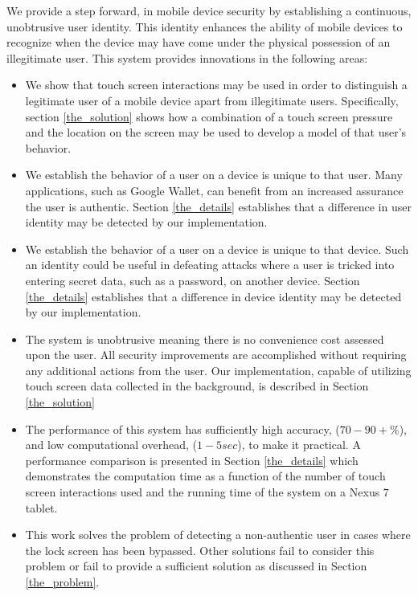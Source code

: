 We provide a step forward, 
%
in mobile device security by
establishing a continuous, unobtrusive user identity.
%
This identity
enhances the ability of mobile devices to
recognize when the 
device may have come under
the physical possession of an illegitimate user.
%
This system provides innovations in the following areas:
\begin{itemize}
\item We show that touch screen interactions may be used in order to
  distinguish a legitimate user of a mobile device apart from
  illegitimate users.
  Specifically, section
  \ref{the_solution} %
  shows how a combination of 
  a touch screen pressure and 
  the location on the screen
  may be used to develop a model of that user's behavior.
\item We establish the behavior of a user on a device
  is unique to that user.
  Many applications, such as Google Wallet,
  can benefit from an increased
  assurance the user is authentic.
  Section 
  \ref{the_details} %
  establishes that a difference in user identity
  may be detected by our implementation.
\item We establish the behavior of a user on a device
  is unique to that device.
  Such an identity could be useful in defeating
  attacks where a user is tricked into entering
  secret data, such as a password,
  on another device.
  Section 
  \ref{the_details} %
  establishes that a difference in device identity
  may be detected by our implementation.
\item The system is unobtrusive meaning there is no convenience cost assessed upon the user.
  All security improvements are accomplished without requiring any additional
  actions from the user.
  Our implementation,
  capable of utilizing touch screen data collected in the background, 
  is described in
  Section
  \ref{the_solution} %
\item The performance of this system 
  has sufficiently high accuracy, ($70-90+\%$), and
  low computational overhead, ($1-5 sec$),
  to make it practical.
  A performance comparison is presented in Section
  \ref{the_details} %
  which demonstrates 
  the computation time as a function of
  the number of touch screen interactions used and
  the running time of the system on a Nexus $7$ tablet.
\item This work solves the problem of
  detecting a non-authentic user
  in cases where the lock screen has been bypassed. %
  Other solutions fail to consider this problem
  or fail to provide a sufficient solution
  as discussed in Section
  \ref{the_problem}.
\end{itemize}

